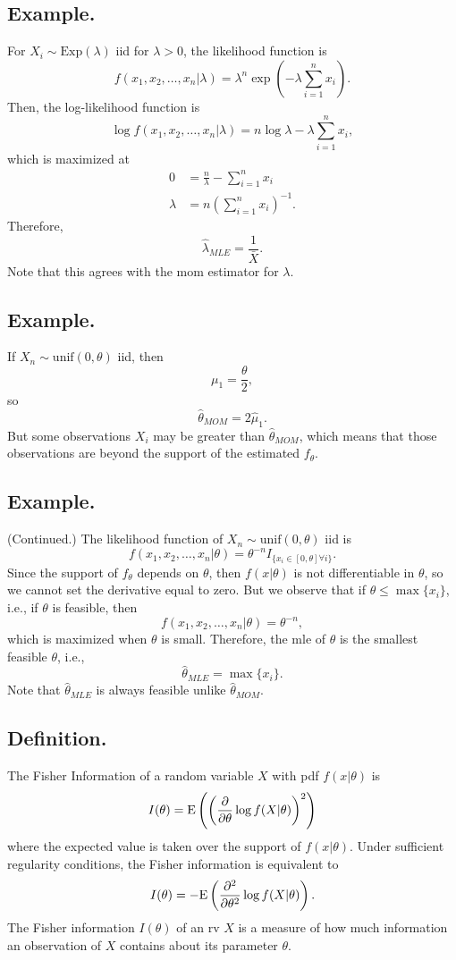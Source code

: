 \documentclass[titlepage]{article}
\begin{document}
\subsection{Example.} For $X_{i} \sim \text{Exp}(\lambda)$ iid for $\lambda > 0$, the likelihood function is 
$$f(x_{1}, x_{2}, \ldots, x_{n}|\lambda) = \lambda^{n}\exp\left(-\lambda\sum_{i=1}^{n}x_{i}\right).$$
Then, the log-likelihood function is 
$$\log f(x_{1}, x_{2}, \ldots, x_{n}|\lambda) = n\log\lambda - \lambda\sum_{i=1}^{n}x_{i},$$
which is maximized at 
\begin{align*}
          0 &= \frac{n}{\lambda} - \sum_{i=1}^{n}x_{i} \\
    \lambda &= n\left(\sum_{i=1}^{n}x_{i}\right)^{-1}.
\end{align*}
Therefore, 
$$\hat{\lambda}_{MLE} = \frac{1}{\bar{X}}.$$
Note that this agrees with the mom estimator for $\lambda$.

\subsection{Example.} If $X_{n} \sim \text{unif}(0, \theta)$ iid, then 
$$\mu_{1} = \frac{\theta}{2},$$
so
$$\hat{\theta}_{MOM} = 2\hat{\mu}_{1}.$$
But some observations $X_{i}$ may be greater than $\hat{\theta}_{MOM}$, which means that those observations are beyond the support of the estimated $f_{\theta}$.

\subsection{Example.} (Continued.) The likelihood function of $X_{n} \sim \text{unif}(0, \theta)$ iid is 
$$f(x_{1}, x_{2}, \ldots, x_{n}|\theta) = \theta^{-n}I_{\{x_{i} \in [0, \theta] \forall i\}}.$$
Since the support of $f_{\theta}$ depends on $\theta$, then $f(x|\theta)$ is not differentiable in $\theta$, so we cannot set the derivative equal to zero. But we observe that if $\theta \leq \max\{x_{i}\}$, i.e., if $\theta$ is feasible, then 
$$f(x_{1}, x_{2}, \ldots, x_{n}|\theta) = \theta^{-n},$$
which is maximized when $\theta$ is small. Therefore, the mle of $\theta$ is the smallest feasible $\theta$, i.e., 
$$\hat{\theta}_{MLE} = \max\{x_{i}\}.$$
Note that $\hat{\theta}_{MLE}$ is always feasible unlike $\hat{\theta}_{MOM}$.

\subsection{Definition.} The Fisher Information of a random variable $X$ with pdf $f(x|\theta)$ is 
$$I(\theta) = \text{E}\left(\left(\frac{\partial}{\partial\theta}\log f(X|\theta)\right)^{2}\right)$$
where the expected value is taken over the support of $f(x|\theta)$. Under sufficient regularity conditions, the Fisher information is equivalent to 
$$I(\theta) = -\text{E}\left(\frac{\partial^{2}}{\partial\theta^{2}}\log f(X|\theta)\right).$$
The Fisher information $I(\theta)$ of an rv $X$ is a measure of how much information an observation of $X$ contains about its parameter $\theta$.
\end{document}
